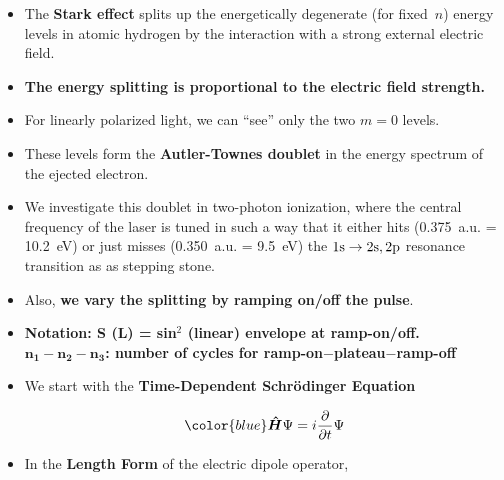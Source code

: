 \documentclass[landscape,a0b,final]{a0poster}
\newenvironment{poster}{
  \begin{center}
  \begin{minipage}[c]{0.98\textwidth}
}{
  \end{minipage} 
  \end{center}
}
\newcommand{\pbox}[4]{
\psshadowbox[#3]{
\begin{minipage}[t][#2][t]{#1}
#4
\end{minipage}
}}
\begin{document}
\begin{poster}
\begin{multicols}{3}
\begin{itemize}
\item The {\bf\color{red}Stark effect} splits up the energetically degenerate (for fixed~$n$) energy levels in atomic
      hydrogen by the interaction with a strong external electric field.
\item {\bf\color{newgreen}The energy splitting is proportional to the electric field strength.}
\item For linearly polarized light, we can ``see'' only the two $m=0$ levels.
\item These levels form the {\bf\color{violet}Autler-Townes doublet} in the energy spectrum
      of the ejected electron.
\item We investigate this doublet in two-photon ionization, where the central frequency
      of the laser is tuned in such a way that it either hits (0.375~a.u. = 10.2~eV) or just misses
      (0.350~a.u. = 9.5~eV) the $\rm 1s \to 2s,2p$ resonance transition as as stepping stone. 
\item Also, {\bf\color{newgreen} we vary the splitting by ramping on/off the pulse}. 
\item {\bf\color{red}Notation: S (L) = sin$^2$ (linear) envelope at ramp-on/off.  \\
\phantom{Notation:} $\boldsymbol{n_1} - \boldsymbol{n_2} - \boldsymbol{n_3}$: number of cycles for ramp-on$-$plateau$-$ramp-off}  
\end{itemize} 

\vfill 
\columnbreak




\vspace{2cm}\begin{center}\pbox{0.8\columnwidth}{}{linewidth=2mm,framearc=0.1,linecolor=lightblue,fillstyle=gradient,
                          gradangle=0,gradbegin=whiteblue,gradend=whiteblue,gradmidpoint=1.0,framesep=1em}{\begin{center}{\Large\bf Numerical Method}\end{center}}\end{center}\vspace{0.375cm}

\begin{itemize}
\item We start with the {\bf\color{red}Time-Dependent Schr\"{o}dinger Equation}

\vspace{-.6cm}
\begin{equation}
{\color{blue}\bm{\hat{H}}\Psi = i\frac{\partial}{\partial t} \Psi}
\end{equation}
\item {In the \bf\color{red}Length Form} of the electric dipole operator,


\end{itemize}
\end{multicols}
\end{poster}
\end{document}
